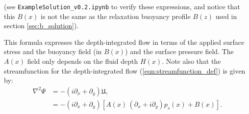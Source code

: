 \documentclass[10pt]{amsart}
\begin{document}
(see \texttt{ExampleSolution\_v0.2.ipynb} to verify these expressions, and notice that this $B(x)$ is not the same as the relaxation buoyancy profile $B(z)$ used in section \ref{sec:b_solution}).

This formula expresses the depth-integrated flow in terms of the applied surface stress and the buoyancy field (in $B(x)$) and the surface pressure field.
The $A(x)$ field only depends on the fluid depth $H(x)$.
Note also that the streamfunction for the depth-integrated flow (\ref{eqn:streamfunction_def}) is given by:
\begin{align}
\nabla^2 \Psi & =  - \left( i \partial_x + \partial_y \right) \mathfrak{U} , \nonumber \\
& =  - \left( i \partial_x + \partial_y \right) \left[ A(x)\,\left( \partial_x + i \partial_y \right) p_s(x)  + B(x) \right] .
\label{eqn:streamfunction_pde}
\end{align}
\end{document}

